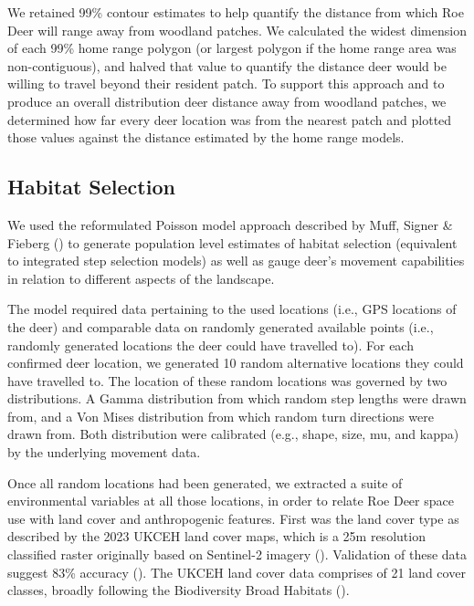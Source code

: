 \documentclass[10pt,a4paper]{article}
\begin{document}
We retained 99\% contour estimates to help quantify the distance from which Roe Deer will range away from woodland patches.
We calculated the widest dimension of each 99\% home range polygon (or largest polygon if the home range area was non-contiguous), and halved that value to quantify the distance deer would be willing to travel beyond their resident patch.
To support this approach and to produce an overall distribution deer distance away from woodland patches, we determined how far every deer location was from the nearest patch and plotted those values against the distance estimated by the home range models.

\subsection{Habitat Selection}\label{habitat-selection}

We used the reformulated Poisson model approach described by Muff, Signer \& Fieberg () to generate population level estimates of habitat selection (equivalent to integrated step selection models) as well as gauge deer's movement capabilities in relation to different aspects of the landscape.

The model required data pertaining to the used locations (i.e., GPS locations of the deer) and comparable data on randomly generated available points (i.e., randomly generated locations the deer could have travelled to).
For each confirmed deer location, we generated 10 random alternative locations they could have travelled to.
The location of these random locations was governed by two distributions.
A Gamma distribution from which random step lengths were drawn from, and a Von Mises distribution from which random turn directions were drawn from.
Both distribution were calibrated (e.g., shape, size, mu, and kappa) by the underlying movement data.

Once all random locations had been generated, we extracted a suite of environmental variables at all those locations, in order to relate Roe Deer space use with land cover and anthropogenic features.
First was the land cover type as described by the 2023 UKCEH land cover maps, which is a 25m resolution classified raster originally based on Sentinel-2 imagery ().
Validation of these data suggest 83\% accuracy ().
The UKCEH land cover data comprises of 21 land cover classes, broadly following the Biodiversity Broad Habitats ().
\end{document}
